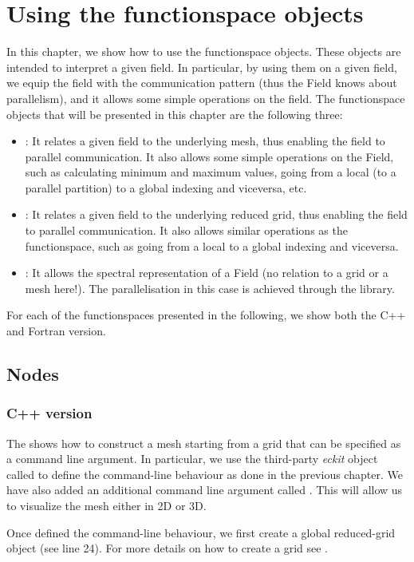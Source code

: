 \chapter{Using the functionspace objects}
In this chapter, we show how to use the functionspace 
objects. These objects are intended to interpret a 
given field. In particular, by using them on a given 
field, we equip the field with the communication pattern 
(thus the Field knows about parallelism), and it allows 
some simple operations on the field. The functionspace 
objects that will be presented in this chapter are the 
following three:
%
\begin{itemize}
\item {}: It relates a given field to the underlying 
mesh, thus enabling the field to parallel communication. 
It also allows some simple operations on the Field, such 
as calculating minimum and maximum values, going from a 
local (to a parallel partition) to a global indexing and 
viceversa, etc.
\item {}: It relates 
a given field to the underlying reduced grid, thus enabling 
the field to parallel communication. It also allows similar 
operations as the  functionspace, such as going 
from a local to a global indexing and viceversa.
\item {}: It allows the spectral representation 
of a Field (no relation to a grid or a mesh here!). The parallelisation 
in this case is achieved through the  
library.
\end{itemize}
%
For each of the functionspaces presented in the following, 
we show both the C++ and Fortran version.

\section{Nodes}
\subsection{C++ version}
The  shows how to construct a mesh 
starting from a grid that can be specified as a command 
line argument. In particular, we use the third-party 
\textit{eckit} object called  to define 
the command-line behaviour as done in the previous chapter. 
We have also added an additional command line argument 
called . This will allow us to 
visualize the mesh either in 2D or 3D. 
%

%
Once defined the command-line behaviour, we first create 
a global reduced-grid object (see line 24). For more 
details on how to create a grid see .


